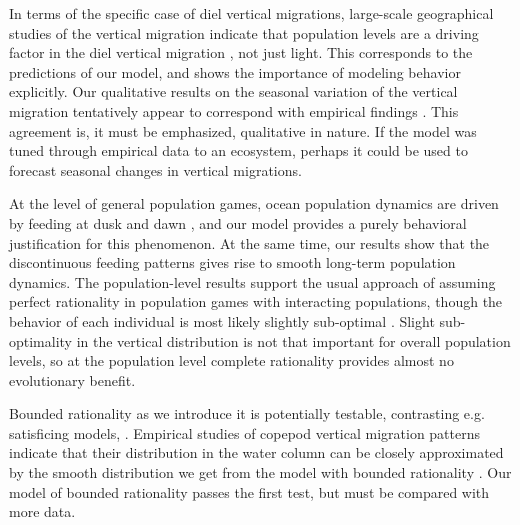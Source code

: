 In terms of the specific case of diel vertical migrations, large-scale geographical studies of the vertical migration indicate that population levels are a driving factor in the diel vertical migration \citep{klevjer2016large}, not just light. This corresponds to the predictions of our model, and shows the importance of modeling behavior explicitly. Our qualitative results on the seasonal variation of the vertical migration tentatively appear to correspond with empirical findings \citep{wang2014seasonal, beaugrand2001geographical, colebrook1979continuous}. This agreement is, it must be emphasized, qualitative in nature. If the model was tuned through empirical data to an ecosystem, perhaps it could be used to forecast seasonal changes in vertical migrations.

At the level of general population games, ocean population dynamics are driven by feeding at dusk and dawn \citep{benoit2014critical}, and our model provides a purely behavioral justification for this phenomenon. At the same time, our results show that the discontinuous feeding patterns gives rise to smooth long-term population dynamics. The population-level results support the usual approach of assuming perfect rationality in population games with interacting populations, though the behavior of each individual is most likely slightly sub-optimal \citep{hurly1999context}. Slight sub-optimality in the vertical distribution is not that important for overall population levels, so at the population level complete rationality provides almost no evolutionary benefit.

Bounded rationality as we introduce it is potentially testable, contrasting e.g. satisficing models, \citep{nonacs1993satisficing}. Empirical studies of copepod vertical migration patterns indicate that their distribution in the water column can be closely approximated by the smooth distribution we get from the model with bounded rationality \citep{hay1991zooplankton, visser2001observations}. Our model of bounded rationality passes the first test, but must be compared with more data.



